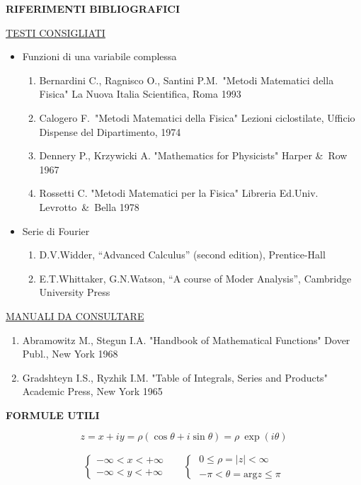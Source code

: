 \documentclass[,12pt]{article}
\begin{document}
\pagebreak
\centerline{\bf RIFERIMENTI BIBLIOGRAFICI}

\hskip3cm

\noindent
\underline{TESTI CONSIGLIATI}

\begin{itemize}
\item{Funzioni di una variabile complessa}
\begin{enumerate}
\item Bernardini C., Ragnisco O., Santini P.M.\  "Metodi Matematici
della Fisica" La Nuova Italia Scientifica, Roma 1993
\item Calogero F.\ "Metodi Matematici della Fisica" Lezioni ciclostilate,
  Ufficio Dispense del Dipartimento, 1974
\item Dennery P., Krzywicki A. "Mathematics for Physicists" Harper
\&\ Row 1967
\item Rossetti C. "Metodi Matematici per la Fisica" Libreria Ed.Univ.
Le\-vrotto\ \&\ Bella 1978
\end{enumerate}
\item{Serie di Fourier}
\begin{enumerate}
\item{D.V.Widder, ``Advanced Calculus'' (second edition), Prentice-Hall}
\item{E.T.Whittaker, G.N.Watson, ``A course of Moder Analysis'', Cambridge University Press}
\end{enumerate}
\end{itemize}

\noindent
\underline{MANUALI DA CONSULTARE}

\begin{enumerate}

\item Abramowitz M., Stegun I.A. "Handbook of Mathematical Functions"
  Dover Publ., New York 1968
\item Gradshteyn I.S., Ryzhik I.M. "Table of Integrals, Series and
Pro\-ducts" Academic Press, New York 1965
\vskip 20pt
\end{enumerate}
\pagebreak

\centerline{\bf FORMULE UTILI}

$$z = x + iy = \rho (\cos \theta + i \sin \theta) =
\rho\  \exp (i \theta)$$

$$\left\{ \begin{array}{c}
- \infty < x < + \infty \\
- \infty < y < + \infty
\end{array}~~~~~~\right\{ \begin{array}{c}
0 \leq \rho = |z| < \infty \\
- \pi < \theta = \mbox{arg} z \leq \pi \end{array}$$
\end{document}
